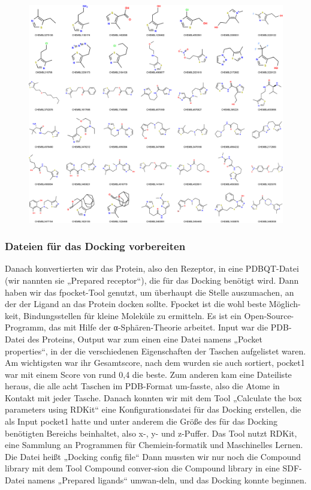 \documentclass[11pt]{article}
\begin{document}
        \begin{figure}
            \includegraphics[width=\textwidth]{P. Falciparum - ligands - visual}\label{fig:figure}
        \end{figure}


        \subsubsection{Dateien für das Docking vorbereiten}
        Danach konvertierten wir das Protein, also den Rezeptor, in eine PDBQT-Datei (wir nannten sie „Prepared receptor“), die für das Docking benötigt wird.
    Dann haben wir das fpocket-Tool genutzt, um überhaupt die Stelle auszumachen, an der der Ligand an das Protein docken sollte. Fpocket ist die wohl beste Möglich-keit, Bindungsstellen für kleine Moleküle zu ermitteln. Es ist ein Open-Source-Programm, das mit Hilfe der α-Sphären-Theorie arbeitet. Input war die PDB-Datei des Proteins, Output war zum einen eine Datei namens „Pocket properties“, in der die verschiedenen Eigenschaften der Taschen aufgelistet waren. Am wichtigsten war ihr Gesamtscore, nach dem wurden sie auch sortiert, pocket1 war mit einem Score von rund 0,4 die beste.
    Zum anderen kam eine Dateiliste heraus, die alle acht Taschen im PDB-Format um-fasste, also die Atome in Kontakt mit jeder Tasche.
    Danach konnten wir mit dem Tool „Calculate the box parameters using RDKit“ eine Konfigurationsdatei für das Docking erstellen, die als Input pocket1 hatte und unter anderem die Größe des für das Docking benötigten Bereichs beinhaltet, also x-, y- und z-Puffer. Das Tool nutzt RDKit, eine Sammlung an Programmen für Chemiein-formatik und Maschinelles Lernen. Die Datei heißt „Docking config file“
    Dann mussten wir nur noch die Compound library mit dem Tool Compound conver-sion die Compound library in eine SDF-Datei namens „Prepared ligands“ umwan-deln, und das Docking konnte beginnen.
\end{document}
